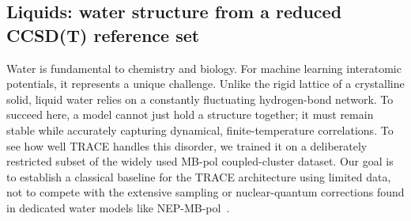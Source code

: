\documentclass[aps,prx,preprint,notitlepage,superscriptaddress,nofootinbib,floatfix]{revtex4-2}
\begin{document}



\subsection{Liquids: water structure from a reduced CCSD(T) reference set}

Water is fundamental to chemistry and biology. For machine learning interatomic potentials, it represents a unique challenge. Unlike the rigid lattice of a crystalline solid, liquid water relies on a constantly fluctuating hydrogen-bond network. To succeed here, a model cannot just hold a structure together; it must remain stable while accurately capturing dynamical, finite-temperature correlations. To see how well TRACE handles this disorder, we trained it on a deliberately restricted subset of the widely used MB-pol coupled-cluster dataset. Our goal is to establish a classical baseline for the TRACE architecture using limited data, not to compete with the extensive sampling or nuclear-quantum corrections found in dedicated water models like NEP-MB-pol~\cite{xu2025}.
\end{document}
